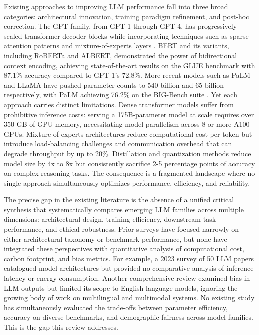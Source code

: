 \documentclass[journal]{IEEEtran}
\begin{document}
Existing approaches to improving LLM performance fall into three broad categories: architectural innovation, training paradigm refinement, and post-hoc correction. The GPT family, from GPT-1 through GPT-4, has progressively scaled transformer decoder blocks while incorporating techniques such as sparse attention patterns and mixture-of-experts layers \cite{r4}. BERT and its variants, including RoBERTa and ALBERT, demonstrated the power of bidirectional context encoding, achieving state-of-the-art results on the GLUE benchmark with 87.1\% accuracy compared to GPT-1's 72.8\%. More recent models such as PaLM and LLaMA have pushed parameter counts to 540 billion and 65 billion respectively, with PaLM achieving 76.2\% on the BIG-Bench suite \cite{r5}. Yet each approach carries distinct limitations. Dense transformer models suffer from prohibitive inference costs: serving a 175B-parameter model at scale requires over 350 GB of GPU memory, necessitating model parallelism across 8 or more A100 GPUs. Mixture-of-experts architectures reduce computational cost per token but introduce load-balancing challenges and communication overhead that can degrade throughput by up to 20\%. Distillation and quantization methods reduce model size by 4x to 8x but consistently sacrifice 2-5 percentage points of accuracy on complex reasoning tasks. The consequence is a fragmented landscape where no single approach simultaneously optimizes performance, efficiency, and reliability.

The precise gap in the existing literature is the absence of a unified critical synthesis that systematically compares emerging LLM families across multiple dimensions: architectural design, training efficiency, downstream task performance, and ethical robustness. Prior surveys have focused narrowly on either architectural taxonomy or benchmark performance, but none have integrated these perspectives with quantitative analysis of computational cost, carbon footprint, and bias metrics. For example, a 2023 survey of 50 LLM papers catalogued model architectures but provided no comparative analysis of inference latency or energy consumption. Another comprehensive review examined bias in LLM outputs but limited its scope to English-language models, ignoring the growing body of work on multilingual and multimodal systems. No existing study has simultaneously evaluated the trade-offs between parameter efficiency, accuracy on diverse benchmarks, and demographic fairness across model families. This is the gap this review addresses.
\end{document}
